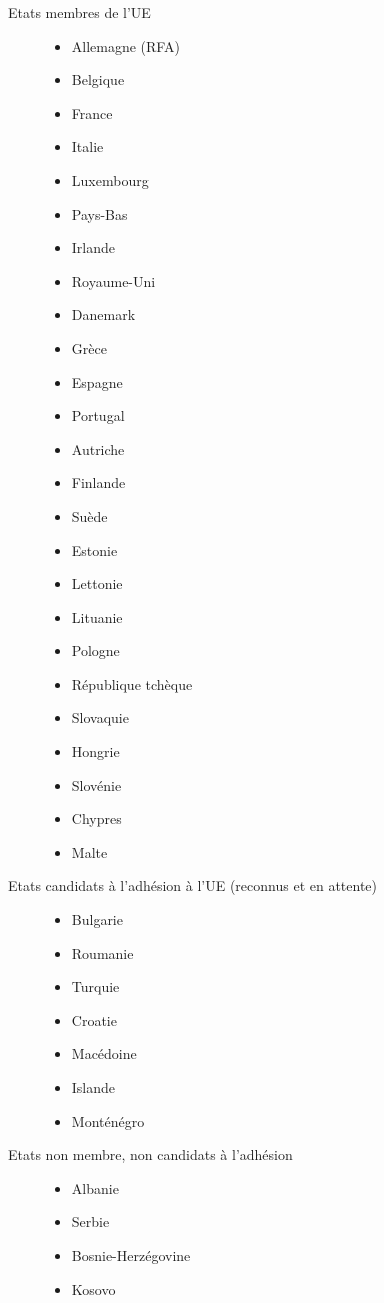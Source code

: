 \begin{description}
\item[Etats membres de l'UE]\hfill
    \begin{itemize}
    \item Allemagne (RFA)
    \item Belgique
    \item France
    \item Italie
    \item Luxembourg
    \item Pays-Bas
    \item Irlande
    \item Royaume-Uni
    \item Danemark
    \item Grèce
    \item Espagne
    \item Portugal
    \item Autriche
    \item Finlande
    \item Suède
    \item Estonie
    \item Lettonie
    \item Lituanie
    \item Pologne
    \item République tchèque
    \item Slovaquie
    \item Hongrie
    \item Slovénie
    \item Chypres
    \item Malte
    \end{itemize}
    \vskip 6pt

\item[Etats candidats à l'adhésion à l'UE (reconnus et en attente)]\hfill
    \begin{itemize}
    \item Bulgarie
    \item Roumanie
    \item Turquie
    \item Croatie
    \item Macédoine
    \item Islande
    \item Monténégro
    \end{itemize}
    \vskip 6pt

\item[Etats non membre, non candidats à l'adhésion]\hfill
    \begin{itemize}
    \item Albanie
    \item Serbie
    \item Bosnie-Herzégovine
    \item Kosovo
    \end{itemize}
    \vskip 6pt

\end{description}
